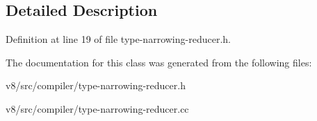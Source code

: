 \subsection{Detailed Description}


Definition at line 19 of file type-\/narrowing-\/reducer.\+h.



The documentation for this class was generated from the following files\+:\begin{DoxyCompactItemize}
\item 
v8/src/compiler/type-\/narrowing-\/reducer.\+h\item 
v8/src/compiler/type-\/narrowing-\/reducer.\+cc\end{DoxyCompactItemize}

